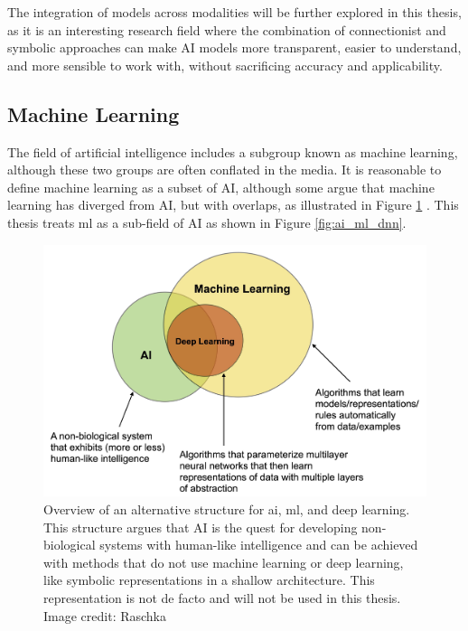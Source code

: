 The integration of models across modalities will be further explored in this thesis, as it is an interesting research field where the combination of connectionist and symbolic approaches can make AI models more transparent, easier to understand, and more sensible to work with, without sacrificing accuracy and applicability.


    \subsection{Machine Learning}

    The field of artificial intelligence includes a subgroup known as machine learning, although these two groups are often conflated in the media. It is reasonable to define machine learning as a subset of AI, although some argue that machine learning has diverged from AI, but with overlaps, as illustrated in Figure \ref{fig:ai_ml_dnn_argue} \cite{raschkaChapterIntroductionMachine0000}. This thesis treats \gls{ml} as a sub-field of AI as shown in Figure \ref{fig:ai_ml_dnn}.


    \begin{figure}[htb]
        \centering
        \includegraphics[width=13cm]{images/ai_ml_dnn_argue.jpeg}
        \caption[Overview of an alternative structure for \gls{ai}, \gls{ml}, and deep learning. This structure argues that AI is the quest for developing non-biological systems with human-like intelligence and can be achieved with methods that do not use machine learning or deep learning, like symbolic representations in a shallow architecture.]{Overview of an alternative structure for \gls{ai}, \gls{ml}, and deep learning. This structure argues that AI is the quest for developing non-biological systems with human-like intelligence and can be achieved with methods that do not use machine learning or deep learning, like symbolic representations in a shallow architecture. This representation is not de facto and will not be used in this thesis. Image credit: Raschka \cite{raschkaChapterIntroductionMachine0000}}
        \label{fig:ai_ml_dnn_argue}
    \end{figure} 

